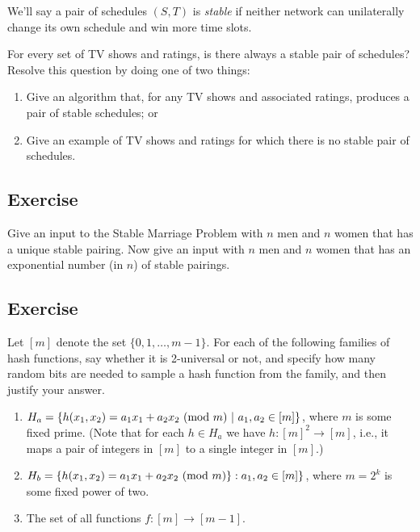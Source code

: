 \documentclass{article}
\newcounter{counter}
\newcommand{\Exercise}{Exercise \stepcounter{counter}\thecounter}
\begin{document}
    \vspace{2mm}
    We'll say a pair of schedules $(S, T)$ is {\it stable} if neither network can unilaterally change its own schedule and win more time slots.  

    \vspace{2mm}
    For every set of TV shows and ratings, is there always a stable pair of schedules?  Resolve this question by doing one of two things: 
    
    \begin{enumerate}[label=\arabic*.]
        \item Give an algorithm that, for any TV shows and associated ratings, produces a pair of stable schedules; or
        \item Give an example of TV shows and ratings for which there is no stable pair of schedules.  
    \end{enumerate}
    
\subsection*{\Exercise}
    Give an input to the Stable Marriage Problem with $n$ men and $n$ women that has a unique stable pairing.   Now give an input with $n$ men and $n$ women that has an exponential number (in $n$) of stable pairings.

\subsection*{\Exercise}
    Let $[m]$ denote the set $\{0,1,\dots, m-1\}$.  For each of the following families of hash functions, say whether it is 2-universal or not, and specify how many random bits are needed to sample a hash function from the family, and then justify your answer.
    \begin{enumerate}
        \item $H_a = \{h(x_1,x_2)=a_1 x_1 + a_2 x_2 \ ({\rm mod} \ m) \ | \ a_1, a_2 \in [m]\}$, where $m$ is some fixed prime.  (Note that for each $h\in H_a$ we have $h: [m]^2 \rightarrow [m]$, i.e., it maps a pair of integers in $[m]$ to a single integer in $[m]$.)
        \item $H_b = \{h(x_1,x_2) = a_1x_1 + a_2 x_2 \ ({\rm mod} \  m) \} : a_1, a_2 \in [m]\}$, where $m=2^k$ is some fixed power of two.
        \item The set of all functions $f: [m]\rightarrow [m-1]$.
    \end{enumerate}
\end{document}
